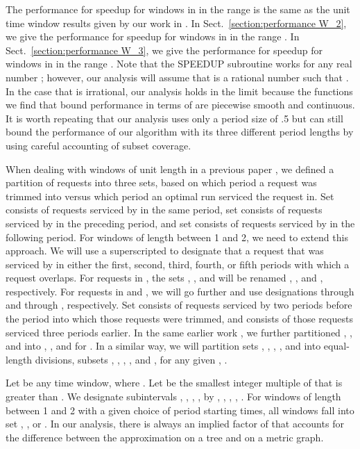 \documentclass[11pt]{article}
\begin{document}
The performance for speedup for windows in  in the range  is the same as the unit time window results given by our work in \cite{Frederickson5}.  In Sect.~\ref{section:performance W_2}, we give the performance for speedup for windows in  in the range .  In Sect.~\ref{section:performance W_3}, we give the performance for speedup for windows in  in the range .  Note that the SPEEDUP subroutine works for any real number ; however, our analysis will assume that  is a rational number such that .  In the case that  is irrational, our analysis holds in the limit because the functions we find that bound performance in terms of  are piecewise smooth and continuous.  It is worth repeating that our analysis uses only a period size of .5 but can still bound the performance of our algorithm with its three different period lengths by using careful accounting of subset coverage.


When dealing with windows of unit length in a previous paper \cite{Frederickson5}, we defined a partition of requests into three sets, based on which period a request was trimmed into versus which period an optimal run  serviced the request in. Set  consists of requests serviced by  in the same period, set  consists of requests serviced by  in the preceding period, and set  consists of requests serviced by  in the following period.  For windows of length between 1 and 2, we need to extend this approach.  We will use a superscripted  to designate that a request that was serviced by  in either the first, second, third, fourth, or fifth periods with which a request overlaps.
For requests in , the sets , , and  will be renamed , , and , respectively.  For requests in  and , we will go further and use designations  through  and  through , respectively. Set  consists of requests serviced by  two periods before the period into which those requests were trimmed, and  consists of those requests serviced three periods earlier.
In the same earlier work \cite{Frederickson5}, we further partitioned , , and  into , , and  for .
In a similar way, we will partition sets , , , , and  into  equal-length divisions, subsets , , , , and , for any given , .

Let  be any time window, where .  Let  be the smallest integer multiple of  that is greater than .  We designate subintervals , , , ,  by , , , , .  For windows of length between 1 and 2 with a given choice of period starting times, all windows fall into set , , or .  In our analysis, there is always an implied factor of  that accounts for the difference between the approximation on a tree and on a metric graph.
\end{document}
